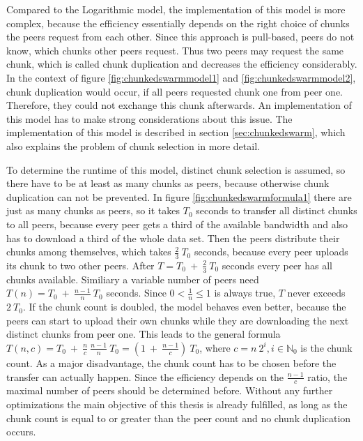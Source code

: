 Compared to the Logarithmic model, the implementation of this model is more complex, because the efficiency essentially depends on the right choice of chunks the peers request from each other. Since this approach is pull-based, peers do not know, which chunks other peers request. Thus two peers may request the same chunk, which is called chunk duplication and decreases the efficiency considerably. In the context of figure \ref{fig:chunkedswarmmodel1} and \ref{fig:chunkedswarmmodel2}, chunk duplication would occur, if all peers requested chunk one from peer one. Therefore, they could not exchange this chunk afterwards. An implementation of this model has to make strong considerations about this issue. The implementation of this model is described in section \ref{sec:chunkedswarm}, which also explains the problem of chunk selection in more detail. 

To determine the runtime of this model, distinct chunk selection is assumed, so there have to be at least as many chunks as peers, because otherwise chunk duplication can not be prevented. In figure \ref{fig:chunkedswarmformula1} there are just as many chunks as peers, so it takes $T_0$ seconds to transfer all distinct chunks to all peers, because every peer gets a third of the available bandwidth and also has to download a third of the whole data set. Then the peers distribute their chunks among themselves, which takes $\frac{2}{3}\:T_0$ seconds, because every peer uploads its chunk to two other peers. After $T = T_0\:+\:\frac{2}{3}\:T_0$ seconds every peer has all chunks available. Similiary a variable number of peers need $T(n) = T_0\:+\:\frac{n - 1}{n}\:T_0$ seconds. Since $0 < \frac{1}{n} \leq 1$ is always true, $T$ never exceeds $2\:T_0$. If the chunk count is doubled, the model behaves even better, because the peers can start to upload their own chunks while they are downloading the next distinct chunks from peer one. This leads to the general formula $T(n, c) = T_0\:+\:\frac{n}{c}\:\frac{n-1}{n}\:T_0 = (1\:+\:\frac{n-1}{c})\:T_0$, where $c = n\:2^i, i \in \mathbb{N}_0$ is the chunk count. As a major disadvantage, the chunk count has to be chosen before the transfer can actually happen. Since the efficiency depends on the $\frac{n-1}{c}$ ratio, the maximal number of peers should be determined before. Without any further optimizations the main objective of this thesis is already fulfilled, as long as the chunk count is equal to or greater than the peer count and no chunk duplication occurs.

